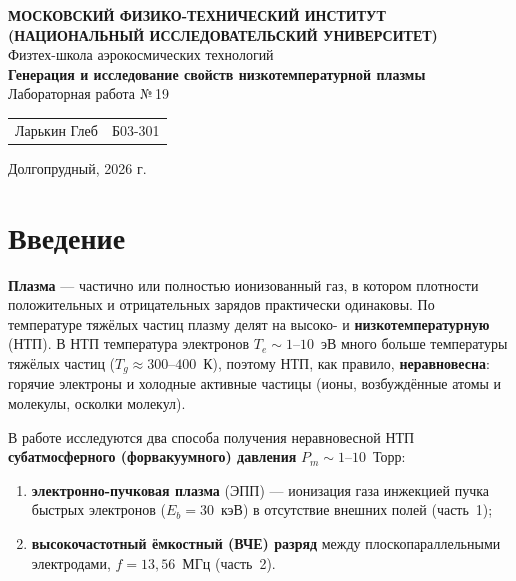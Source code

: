 \documentclass[12pt,a4paper]{article}
\begin{document}
\begin{titlepage}
    \begin{center}
        \textbf{МОСКОВСКИЙ ФИЗИКО-ТЕХНИЧЕСКИЙ ИНСТИТУТ} \\
        \textbf{(НАЦИОНАЛЬНЫЙ ИССЛЕДОВАТЕЛЬСКИЙ УНИВЕРСИТЕТ)}
        \\[1cm]
        {\large Физтех-школа аэрокосмических технологий}
        \\[3.5cm]
        {\Huge \textbf{Генерация и исследование свойств низкотемпературной плазмы}}
        \\[0.5cm]
        {\large Лабораторная работа №\,19}
        \\[1.5cm]
        \begin{flushright}
            \begin{tabular}{l l}
                Ларькин Глеб & Б03-301 \\
            \end{tabular}
        \end{flushright}
        \vfill
        {\large Долгопрудный, 2026 г.}
    \end{center}
\end{titlepage}

\tableofcontents
\newpage

\section{Введение}

\textbf{Плазма} --- частично или полностью ионизованный газ, в котором
плотности положительных и отрицательных зарядов практически одинаковы.
По температуре тяжёлых частиц плазму делят на высоко- и
\textbf{низкотемпературную} (НТП). В НТП температура электронов
$T_e \sim 1$--$10$~эВ много больше температуры тяжёлых частиц
($T_g \approx 300$--$400$~К), поэтому НТП, как правило,
\textbf{неравновесна}: горячие электроны и холодные активные частицы
(ионы, возбуждённые атомы и молекулы, осколки молекул).

В работе исследуются два способа получения неравновесной НТП
\textbf{субатмосферного (форвакуумного) давления} $P_m \sim 1$--$10$~Торр:
\begin{enumerate}
  \item \textbf{электронно-пучковая плазма} (ЭПП) --- ионизация газа
        инжекцией пучка быстрых электронов ($E_b = 30$~кэВ) в отсутствие
        внешних полей (часть~1);
  \item \textbf{высокочастотный ёмкостный (ВЧЕ) разряд} между
        плоскопараллельными электродами, $f = 13{,}56$~МГц (часть~2).
\end{enumerate}
\end{document}
